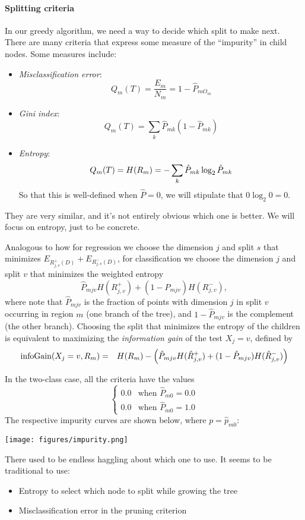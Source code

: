 \paragraph*{Splitting criteria}
In our greedy algorithm, we need a way to decide which split to make
next.  There are many criteria that express some measure of the 
``impurity'' in child nodes.  Some measures include:
\begin{itemize}
\item {\em Misclassification error}: 
  \begin{equation}
    Q_m(T) = \frac{E_m}{N_m} = 1 - \hat{P}_{mO_m}
    \end{equation}
\item {\em Gini index}:
  \begin{equation}
    Q_m(T) = \sum_k \hat{P}_{mk}(1 - \hat{P}_{mk})
    \end{equation}
\item {\em Entropy}: 
  \begin{equation}
    Q_m(T) = H(R_m) = - \sum_k \hat{P}_{mk} \log_2 \hat{P}_{mk}
    \end{equation}
So that this is well-defined when $\hat{P} = 0$, we will stipulate that $0
\log_2 0 = 0$.
\end{itemize}
They are very similar, and it's not entirely obvious which one is
better.   We will focus on entropy, just to be concrete.

Analogous to how for regression we choose the dimension $j$ and split
$s$ that minimizes $E_{R_{j,v}^{+}(D)}+E_{R_{j,v}^{-}(D)}$, for
classification we choose the dimension $j$ and split $v$ that
minimizes the weighted entropy $$ \hat{P}_{mjv} H(R_{j,v}^{+}) +
(1-\hat{P}_{mjv}) H(R_{j,v}^{-}), $$ where note that $\hat{P}_{mjv}$
is the fraction of points with dimension $j$ in split $v$ occurring in region $m$ (one branch of the tree), 
and $1-\hat{P}_{mjv}$
is the complement (the other branch).
Choosing the split that minimizes the entropy of the children is
equivalent to maximizing the {\em information gain} of the test $X_j =
v$, defined by 
\begin{eqnarray}
{\rm infoGain}(X_j = v, R_m) & = & H(R_m) - 
\left(\hat{P}_{mjv}H(\hat{R}^+_{j, v}) + (1 - \hat{P}_{mjv})H(\hat{R}^-_{j, v})\right)
\end{eqnarray}

In the two-class case, all the criteria have the values
\[
\begin{cases}
0.0 & \text{when $\hat{P}_{m0} = 0.0$}\\
0.0 & \text{when $\hat{P}_{m0} = 1.0$}
\end{cases}
\]
The respective impurity curves are shown below, where $p = \hat{p
}_{m0}$:
\begin{center}
\texttt{[image: figures/impurity.png]}
\end{center}
There used to be endless haggling about which one to use.  It seems to
be traditional to use:
\begin{itemize}
\item Entropy to select which node to split while growing the tree
\item Misclassification error in the pruning criterion
\end{itemize}

